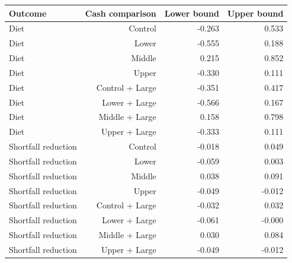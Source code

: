 \begin{tabular}{lrrr}
\toprule
Outcome & Cash comparison & Lower bound & Upper bound \\
\midrule
Diet & Control & -0.263 & 0.533 \\
Diet & Lower & -0.555 & 0.188 \\
Diet & Middle & 0.215 & 0.852 \\
Diet & Upper & -0.330 & 0.111 \\
Diet & Control + Large & -0.351 & 0.417 \\
Diet & Lower + Large & -0.566 & 0.167 \\
Diet & Middle + Large & 0.158 & 0.798 \\
Diet & Upper + Large & -0.333 & 0.111 \\
Shortfall reduction & Control & -0.018 & 0.049 \\
Shortfall reduction & Lower & -0.059 & 0.003 \\
Shortfall reduction & Middle & 0.038 & 0.091 \\
Shortfall reduction & Upper & -0.049 & -0.012 \\
Shortfall reduction & Control + Large & -0.032 & 0.032 \\
Shortfall reduction & Lower + Large & -0.061 & -0.000 \\
Shortfall reduction & Middle + Large & 0.030 & 0.084 \\
Shortfall reduction & Upper + Large & -0.049 & -0.012 \\
\bottomrule
\end{tabular}
